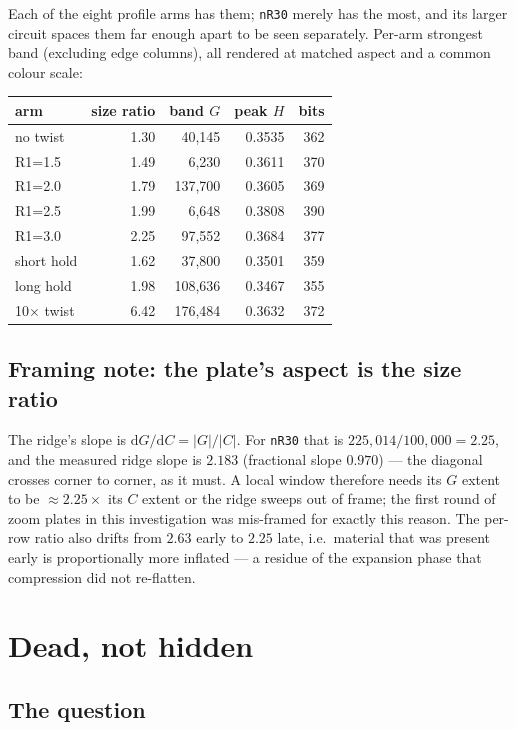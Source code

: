 \documentclass[11pt]{article}
\newcommand{\code}[1]{\texttt{#1}}
\begin{document}
Each of the eight profile arms has them; \code{nR30} merely has the most,
and its larger circuit spaces them far enough apart to be seen separately.
Per-arm strongest band (excluding edge columns), all rendered at matched
aspect and a common colour scale:

\begin{center}\small
\begin{tabular}{lrrrr}
\toprule
arm & size ratio & band $G$ & peak $H$ & bits \\
\midrule
no twist & 1.30 & 40{,}145 & 0.3535 & 362 \\
R1=1.5 & 1.49 & 6{,}230 & 0.3611 & 370 \\
R1=2.0 & 1.79 & 137{,}700 & 0.3605 & 369 \\
R1=2.5 & 1.99 & 6{,}648 & 0.3808 & 390 \\
R1=3.0 & 2.25 & 97{,}552 & 0.3684 & 377 \\
short hold & 1.62 & 37{,}800 & 0.3501 & 359 \\
long hold & 1.98 & 108{,}636 & 0.3467 & 355 \\
10$\times$ twist & 6.42 & 176{,}484 & 0.3632 & 372 \\
\bottomrule
\end{tabular}
\end{center}

\subsection{Framing note: the plate's aspect is the size ratio}

The ridge's slope is $\mathrm{d}G/\mathrm{d}C = |G|/|C|$. For \code{nR30}
that is $225{,}014/100{,}000 = 2.25$, and the measured ridge slope is
$2.183$ (fractional slope $0.970$) --- the diagonal crosses corner to
corner, as it must. A local window therefore needs its $G$ extent to be
$\approx 2.25\times$ its $C$ extent or the ridge sweeps out of frame; the
first round of zoom plates in this investigation was mis-framed for exactly
this reason. The per-row ratio also drifts from $2.63$ early to $2.25$ late,
i.e.\ material that was present early is proportionally more inflated ---
a residue of the expansion phase that compression did not re-flatten.

\section{Dead, not hidden}

\subsection{The question}
\end{document}

